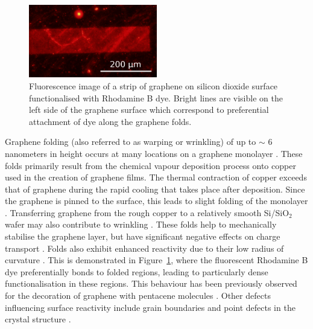 \documentclass[
  a4paper,
]{scrbook}
\begin{document}
\begin{figure}

{\centering \includegraphics[width=0.5\textwidth,height=\textheight]{figures/ch2/modified_NGW8D4_1mM_rhodamineB_centralchannel3_postMsurfactantclean5min_2.4sexposure_20X_221111.png}

}

\caption{\label{fig-graphene-folds}Fluorescence image of a strip of
graphene on silicon dioxide surface functionalised with Rhodamine B dye.
Bright lines are visible on the left side of the graphene surface which
correspond to preferential attachment of dye along the graphene folds.}

\end{figure}

Graphene folding (also referred to as warping or wrinkling) of up to
\(\sim\) 6 nanometers in height occurs at many locations on a graphene
monolayer \autocite{Zhu2012}. These folds primarily result from the
chemical vapour deposition process onto copper used in the creation of
graphene films. The thermal contraction of copper exceeds that of
graphene during the rapid cooling that takes place after deposition.
Since the graphene is pinned to the surface, this leads to slight
folding of the monolayer \autocite{Zhao2012,Zhu2012,Chhikara2013}.
Transferring graphene from the rough copper to a relatively smooth
Si/SiO\(_2\) wafer may also contribute to wrinkling
\autocite{Zhao2012,Kireev2017}. These folds help to mechanically
stabilise the graphene layer, but have significant negative effects on
charge transport \autocite{Geim2007,Chhikara2013,Zhu2012}. Folds also
exhibit enhanced reactivity due to their low radius of curvature
\autocite{Zhao2012}. This is demonstrated in
Figure~\ref{fig-graphene-folds}, where the fluorescent Rhodamine B dye
preferentially bonds to folded regions, leading to particularly dense
functionalisation in these regions. This behaviour has been previously
observed for the decoration of graphene with pentacene molecules
\autocite{Chhikara2013}. Other defects influencing surface reactivity
include grain boundaries and point defects in the crystal structure
\autocite{Zhao2012,Chhikara2013,Kireev2017}.
\end{document}
